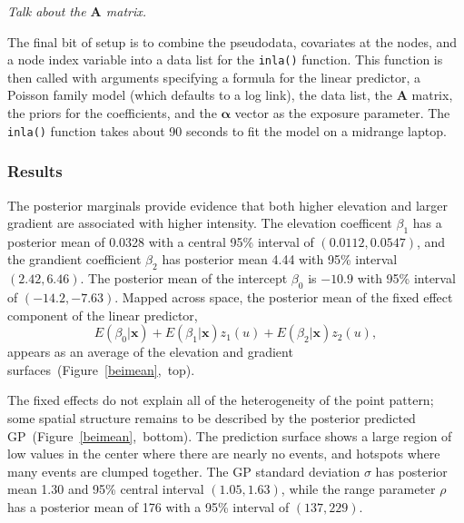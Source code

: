 \documentclass[]{interact}
\begin{document}
{\it Talk about the \(\mathbf{A}\) matrix.}

The final bit of setup is to combine the pseudodata, covariates at the nodes,
and a node index variable into a data list for the \texttt{inla()} function.
This function is then called with arguments specifying a formula for the
linear predictor, a Poisson family model (which defaults to a log link), the
data list, the \(\mathbf{A}\) matrix, the priors for the coefficients, and the
\(\boldsymbol{\alpha}\) vector as the exposure parameter. The \texttt{inla()}
function takes about 90 seconds to fit the model on a midrange laptop.


\subsubsection{Results}
\label{beiresults}

The posterior marginals provide evidence that both higher elevation and larger
gradient are associated with higher intensity. The elevation coefficent
\(\beta_{1}\) has a posterior mean of 0.0328 with a central 95\% interval of
\((0.0112, 0.0547)\), and the grandient coefficient \(\beta_{2}\) has posterior
mean 4.44 with 95\% interval \((2.42, 6.46)\). The posterior mean of the
intercept \(\beta_{0}\) is \(-10.9\) with 95\% interval of \((-14.2, -7.63)\).
Mapped across space, the posterior mean of the fixed effect component of the
linear predictor,
\begin{displaymath}
E(\beta_{0} | \mathbf{x}) + E(\beta_{1} | \mathbf{x}) z_{1}(u)
+ E(\beta_{2} | \mathbf{x}) z_{2}(u),
\end{displaymath}
appears as an average of the elevation and gradient
surfaces~(Figure~\ref{beimean},~top).

The fixed effects do not explain all of the heterogeneity of the point pattern;
some spatial structure remains to be described by the posterior predicted
GP~(Figure~\ref{beimean},~bottom). The prediction surface shows a large region
of low values in the center where there are nearly no events, and hotspots
where many events are clumped together. The GP standard deviation \(\sigma\)
has posterior mean 1.30 and 95\% central interval \((1.05, 1.63)\), while the
range parameter \(\rho\) has a posterior mean of 176 with a 95\% interval of
\((137, 229)\).
\end{document}
